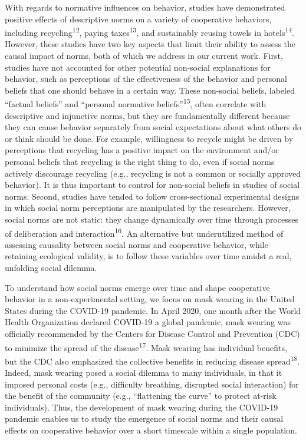 \documentclass[
  man, donotrepeattitle,floatsintext]{apa6}
\begin{document}
With regards to normative influences on behavior, studies have demonstrated positive effects of descriptive norms on a variety of cooperative behaviors, including recycling\textsuperscript{12}, paying taxes\textsuperscript{13}, and sustainably reusing towels in hotels\textsuperscript{14}. However, these studies have two key aspects that limit their ability to assess the causal impact of norms, both of which we address in our current work. First, studies have not accounted for other potential non-social explanations for behavior, such as perceptions of the effectiveness of the behavior and personal beliefs that one should behave in a certain way. These non-social beliefs, labeled ``factual beliefs'' and ``personal normative beliefs''\textsuperscript{15}, often correlate with descriptive and injunctive norms, but they are fundamentally different because they can cause behavior separately from social expectations about what others do or think should be done. For example, willingness to recycle might be driven by perceptions that recycling has a positive impact on the environment and/or personal beliefs that recycling is the right thing to do, even if social norms actively discourage recycling (e.g., recycling is not a common or socially approved behavior). It is thus important to control for non-social beliefs in studies of social norms. Second, studies have tended to follow cross-sectional experimental designs in which social norm perceptions are manipulated by the researchers. However, social norms are not static: they change dynamically over time through processes of deliberation and interaction\textsuperscript{16}. An alternative but underutilized method of assessing causality between social norms and cooperative behavior, while retaining ecological validity, is to follow these variables over time amidst a real, unfolding social dilemma.

To understand how social norms emerge over time and shape cooperative behavior in a non-experimental setting, we focus on mask wearing in the United States during the COVID-19 pandemic. In April 2020, one month after the World Health Organization declared COVID-19 a global pandemic, mask wearing was officially recommended by the Centers for Disease Control and Prevention (CDC) to minimize the spread of the disease\textsuperscript{17}. Mask wearing has individual benefits, but the CDC also emphasized the collective benefits in reducing disease spread\textsuperscript{18}. Indeed, mask wearing posed a social dilemma to many individuals, in that it imposed personal costs (e.g., difficulty breathing, disrupted social interaction) for the benefit of the community (e.g., ``flattening the curve'' to protect at-risk individuals). Thus, the development of mask wearing during the COVID-19 pandemic enables us to study the emergence of social norms and their causal effects on cooperative behavior over a short timescale within a single population.
\end{document}
